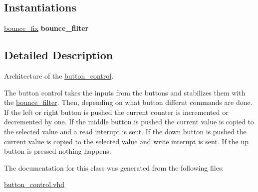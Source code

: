 \subsection*{Instantiations}
 \begin{DoxyCompactItemize}
\item 
\hypertarget{classbutton__control_1_1RTL_a924c71cbbbc369e0a5cca302dfb6cf50}{\hyperlink{classbutton__control_1_1RTL_a924c71cbbbc369e0a5cca302dfb6cf50}{bounce\-\_\-fix}  {\bfseries bounce\-\_\-filter}   }\label{classbutton__control_1_1RTL_a924c71cbbbc369e0a5cca302dfb6cf50}

\end{DoxyCompactItemize}


\subsection{Detailed Description}
Architecture of the \hyperlink{classbutton__control}{button\-\_\-control}. 

The button control takes the inputs from the buttons and stabilizes them with the \hyperlink{classbounce__filter}{bounce\-\_\-filter}. Then, depending on what button differnt commands are done. If the left or right button is pushed the current counter is incremented or decremented by one. If the middle button is pushed the current value is copied to the selected value and a read interupt is sent. If the down button is pushed the current value is copied to the selected value and write interupt is sent. If the up button is pressed nothing happens. 

The documentation for this class was generated from the following files\-:\begin{DoxyCompactItemize}
\item 
\hyperlink{button__control_8vhd}{button\-\_\-control.\-vhd}\end{DoxyCompactItemize}
